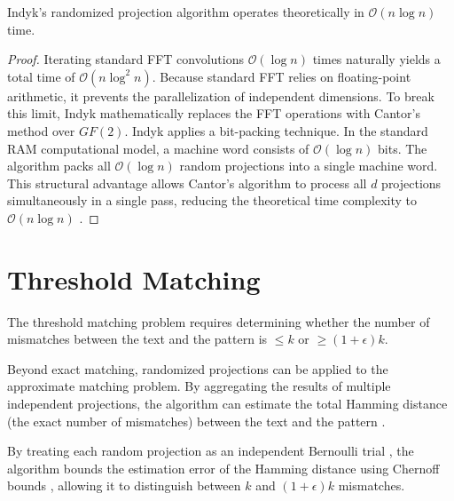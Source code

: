 \begin{theorem}
Indyk's randomized projection algorithm operates theoretically in $\mathcal{O}(n \log n)$ time.
\end{theorem}

\begin{proof}
Iterating standard FFT convolutions $\mathcal{O}(\log n)$ times naturally yields a total time of $\mathcal{O}(n \log^2 n)$. Because standard FFT relies on floating-point arithmetic, it prevents the parallelization of independent dimensions. To break this limit, Indyk mathematically replaces the FFT operations with Cantor's method \cite{cantor1989} over $GF(2)$. Indyk applies a bit-packing technique. In the standard RAM computational model, a machine word consists of $\mathcal{O}(\log n)$ bits. The algorithm packs all $\mathcal{O}(\log n)$ random projections into a single machine word. This structural advantage allows Cantor's algorithm to process all $d$ projections simultaneously in a single pass, reducing the theoretical time complexity to $\mathcal{O}(n \log n)$ \cite{indyk1998}.
\end{proof}

\section{Threshold Matching}
\begin{definition}
The threshold matching problem requires determining whether the number of mismatches between the text and the pattern is $\le k$ or $\ge (1 + \epsilon)k$.
\end{definition}

Beyond exact matching, randomized projections can be applied to the approximate matching problem. By aggregating the results of multiple independent projections, the algorithm can estimate the total Hamming distance (the exact number of mismatches) between the text and the pattern \cite{indyk1998}.

\begin{lemma}
By treating each random projection as an independent Bernoulli trial \cite{motwani1995}, the algorithm bounds the estimation error of the Hamming distance using Chernoff bounds \cite{motwani1995}, allowing it to distinguish between $k$ and $(1+\epsilon)k$ mismatches.
\end{lemma}

